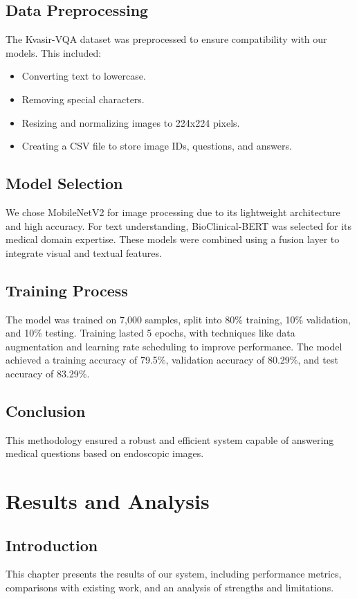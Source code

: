 \documentclass[12pt,a4paper]{report}
\begin{document}
\section{Data Preprocessing}
The Kvasir-VQA dataset was preprocessed to ensure compatibility with our models. This included:
\begin{itemize}
    \item Converting text to lowercase.
    \item Removing special characters.
    \item Resizing and normalizing images to 224x224 pixels.
    \item Creating a CSV file to store image IDs, questions, and answers.
\end{itemize}

\section{Model Selection}
We chose MobileNetV2 for image processing due to its lightweight architecture and high accuracy. For text understanding, BioClinical-BERT was selected for its medical domain expertise. These models were combined using a fusion layer to integrate visual and textual features.

\section{Training Process}
The model was trained on 7,000 samples, split into 80\% training, 10\% validation, and 10\% testing. Training lasted 5 epochs, with techniques like data augmentation and learning rate scheduling to improve performance. The model achieved a training accuracy of 79.5\%, validation accuracy of 80.29\%, and test accuracy of 83.29\%.

\section{Conclusion}
This methodology ensured a robust and efficient system capable of answering medical questions based on endoscopic images.

\chapter{Results and Analysis}
\section{Introduction}
This chapter presents the results of our system, including performance metrics, comparisons with existing work, and an analysis of strengths and limitations.
\end{document}
